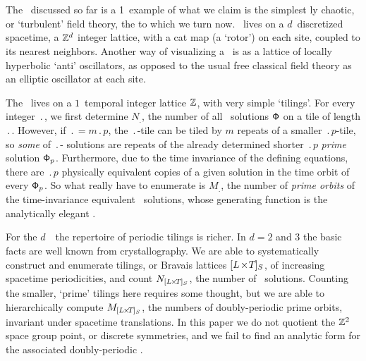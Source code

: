 
\section{\catLatt} %
\label{s:catlatt}


The \templatt\ discussed so far is a 1\dmn\ example of what we claim is
the simplest {\spt}ly chaotic, or `turbulent' field theory,
the {\em \catlatt} to which we turn now.
\catLatt\ lives on a  $d$\dmn\ discretized spacetime,
a {\spt} $\mathbb{Z}^d$ integer lattice,
with a cat map (a `rotor') on each site, coupled to its
nearest neighbors. Another way of visualizing a \catlatt\ is as a lattice
of locally hyperbolic `anti' oscillators, as opposed to the usual
free classical field theory as an elliptic oscillator at each site.

The \templatt\ lives on a $1$\dmn\ temporal integer lattice $\mathbb{Z}$,
with very  simple `tilings'. For every integer $\period{}$,
we first determine $N_\period{}$, the number of all \po\ solutions $\mathsf{\Phi}$ on a tile of length $\period{}$.
However, if $\period{}=m\period{p}$, the $\period{}$-tile can be tiled by $m$ repeats of a smaller  $\period{p}$-tile,
so \emph{some} of $\period{}$-{\po} {solutions} are repeats of the already determined shorter $\period{p}$
\emph{prime} solution  $\mathsf{\Phi}_p$. Furthermore, due to the time invariance of the defining equations, there are $\period{p}$
physically equivalent copies of a given solution in the time orbit of every $\mathsf{\Phi}_p$.
So what really have to enumerate is $M_\period{}$, the number of {\em prime orbits} of the time-invariance
equivalent \po\ solutions, whose generating function is the analytically elegant {\tzeta}.

For the $d$\dmn\ \catlatt\ the repertoire of periodic tilings is richer. In $d=2$ and $3$
the basic facts are well known from crystallography. We are able to systematically construct and enumerate
tilings, or Bravais lattices ${[{L_{}}\!\times\!{T_{}}]_{S_{}}}$, of increasing spacetime periodicities, and count $N_{{[{L_{}}\!\times\!{T_{}}]_{S_{}}}}$,
the number of \po\ solutions. Counting the smaller, `prime' tilings here requires some thought,
but we are able to hierarchically compute $M_{{[{L_{}}\!\times\!{T_{}}]_{S_{}}}}$, the numbers of doubly-periodic
prime orbits, invariant under spacetime translations. In this paper we do not quotient the $\mathbb{Z}^2$
space group point, or discrete symmetries,
and we fail to find an analytic form for the associated doubly-periodic {\tzeta}.



